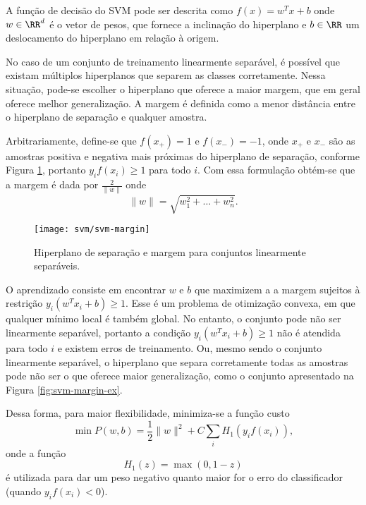 A função de decisão do SVM pode ser descrita como $f(x)=w^T x+ b$ onde $w \in \RR^d$ é o vetor de pesos, que fornece a inclinação do hiperplano e $b \in \RR$ um deslocamento do hiperplano em relação à origem. 

No caso de um conjunto de treinamento linearmente separável, é possível que existam múltiplos hiperplanos que separem as classes corretamente. Nessa situação, pode-se escolher o hiperplano que oferece a maior margem, que em geral oferece melhor generalização. A margem é definida como a menor distância entre o hiperplano de separação e qualquer amostra. 

Arbitrariamente, define-se que $f(x_+)=1$ e $f(x_-)=-1$, onde $x_+$ e $x_-$ são as amostras positiva e negativa mais próximas do hiperplano de separação, conforme Figura \ref{fig:svm-margin}, portanto $y_i f(x_i) \geq 1$ para todo $i$. Com essa formulação obtém-se que a margem é dada por $\frac{2}{\|w\|}$ onde
\begin{equation}
\|w\| = \sqrt{w_1^2 + \dots + w_n^2}.
\end{equation}

\begin{figure}
\centering
\texttt{[image: svm/svm-margin]}
\caption{Hiperplano de separação e margem para conjuntos linearmente separáveis.}
\label{fig:svm-margin}
\end{figure}

O aprendizado consiste em encontrar $w$ e $b$ que maximizem a a margem sujeitos à restrição $y_i(w^T x_i+b) \geq 1$. Esse é um problema de otimização convexa, em que qualquer mínimo local é também global. No entanto, o conjunto pode não ser linearmente separável, portanto a condição $y_i(w^T x_i+b) \geq 1$ não é atendida para todo $i$ e existem erros de treinamento. Ou, mesmo sendo o conjunto linearmente separável, o hiperplano que separa corretamente todas as amostras pode não ser o que oferece maior generalização, como o conjunto apresentado na Figura \ref{fig:svm-margin-ex}. 

Dessa forma, para maior flexibilidade, minimiza-se a função custo \cite{bishop2007}
\begin{equation}
	\label{eq:svm-cost}
	\min P(w,b) = \frac{1}{2}\|w\|^2 + C\sum_i H_1(y_i f(x_i)),
\end{equation}
onde a função
\begin{equation*}
H_1(z)=\max(0,1-z)
\end{equation*}
é utilizada para dar um peso negativo quanto maior for o erro do classificador (quando $y_i f(x_i)<0$).

